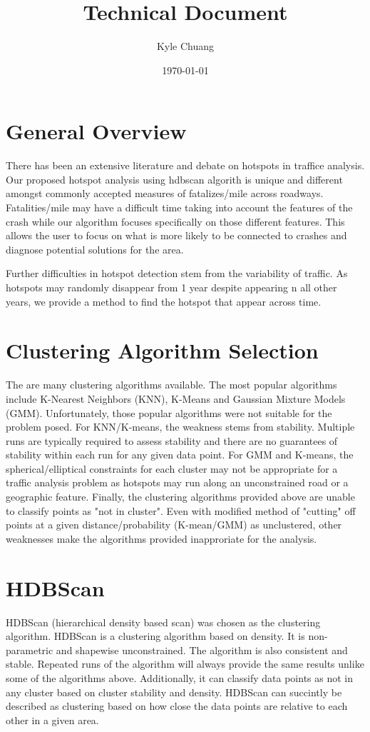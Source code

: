 \documentclass{article}
\begin{document}
\title{Technical Document}
\date{\today}
\author{Kyle Chuang}

\section{General Overview}
There has been an extensive literature and debate on hotspots in traffice analysis. Our proposed hotspot analysis using hdbscan algorith is unique and different amongst commonly accepted measures of fatalizes/mile across roadways. Fatalities/mile may have a difficult time taking into account the features of the crash while our algorithm focuses specifically on those different features. This allows the user to focus on what is more likely to be connected to crashes and diagnose potential solutions for the area.

Further difficulties in hotspot detection stem from the variability of traffic. As hotspots may randomly disappear from 1 year despite appearing n all other years, we provide a method to find the hotspot that appear across time.

\section{Clustering Algorithm Selection}
The are many clustering algorithms available. The most popular algorithms include K-Nearest Neighbors (KNN), K-Means and Gaussian Mixture Models (GMM). Unfortunately, those popular algorithms were not suitable for the problem posed. For KNN/K-means, the weakness stems from stability. Multiple runs are typically required to assess stability and there are no guarantees of stability within each run for any given data point. For GMM and K-means, the spherical/elliptical constraints for each cluster may not be appropriate for a traffic analysis problem as hotspots may run along an unconstrained road or a geographic feature. Finally, the clustering algorithms provided above are unable to classify points as "not in cluster". Even with modified method of "cutting" off points at a given distance/probability (K-mean/GMM) as unclustered, other weaknesses make the algorithms provided inapproriate for the analysis.

\section{HDBScan}
HDBScan (hierarchical density based scan) was chosen as the clustering algorithm. HDBScan is a clustering algorithm based on density. It is non-parametric and shapewise unconstrained. The algorithm is also consistent and stable. Repeated runs of the algorithm will always provide the same results unlike some of the algorithms above. Additionally, it can classify data points as not in any cluster based on cluster stability and density.  HDBScan can succintly be described as clustering based on how close the data points are relative to each other in a given area.
\end{document}
